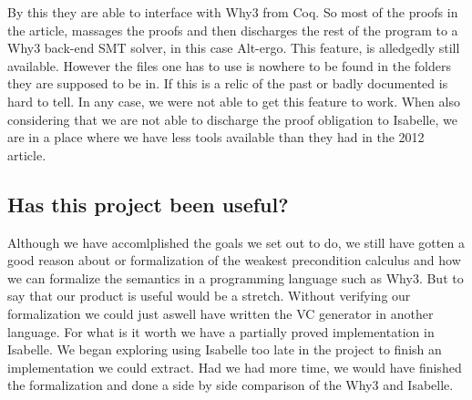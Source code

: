 By this they are able to interface with Why3 from Coq.
So most of the proofs in the article, massages the proofs and then discharges the rest of the program to a Why3 back-end SMT solver, in this case Alt-ergo.
This feature, is alledgedly still available\cite{TODO:LIERS}. However the files one has to use is nowhere to be found in the folders they are supposed to be in.
If this is a relic of the past or badly documented is hard to tell. In any case, we were not able to get this feature to work.
When also considering that we are not able to discharge the proof obligation to Isabelle, we are in a place where we have less tools available than they had in the 2012 article.

\subsection{Has this project been useful?}
Although we have accomlplished the goals we set out to do, we still have gotten a good reason about or formalization of the weakest precondition calculus and how we can formalize the semantics in a programming language such as Why3.
But to say that our product is useful would be a stretch. Without verifying our formalization we could just aswell have written the VC generator in another language.
For what is it worth we have a partially proved implementation in Isabelle.
We began exploring using Isabelle too late in the project to finish an implementation we could extract.
Had we had more time, we would have finished the formalization and done a side by side comparison of the Why3 and Isabelle.
